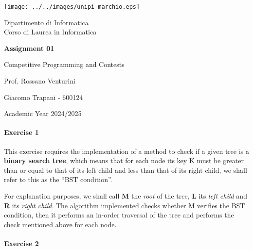 \documentclass[12pt]{report}
\theoremstyle{definition}
\theoremstyle{definition}
\begin{document}
\begin{titlepage}
	\clearpage\thispagestyle{empty}
	\centering
	\vspace{1cm}

	\texttt{[image: ../../images/unipi-marchio.eps]}

	{\normalsize \noindent Dipartimento di Informatica \\
			Corso di Laurea in Informatica \par}
	
	\vspace{2cm}
	{\huge \textbf{Assignment 01} \par }
	\vspace{1cm}
	{\large Competitive Programming and Contests}

	\vspace{3cm}

	\begin{minipage}[t]{0.47\textwidth}
		{\large{Prof. Rossano Venturini}}
	\end{minipage}\hfill\begin{minipage}[t]{0.47\textwidth}\raggedleft
		{\large {Giacomo Trapani - 600124}}
	\end{minipage}

	\vspace{3cm}

	{\normalsize Academic Year 2024/2025 \par}

	\pagebreak
\end{titlepage}
\paragraph*{Exercise 1}
This exercise requires the implementation of a method to check if a given tree
is a \textbf{binary search tree}, which means that for each node its key K must
be greater than or equal to that of its left child and less than that of its
right child, we shall refer to this as the ``BST condition''.

For explanation purposes, we shall call \textbf{M} the \textit{root} of the tree,
\textbf{L} its \textit{left child} and \textbf{R} its \textit{right child}.
The algorithm implemented checks whether M verifies the BST condition, then it
performs an in-order traversal of the tree and performs the check mentioned above
for each node.
\paragraph*{Exercise 2}
\end{document}
